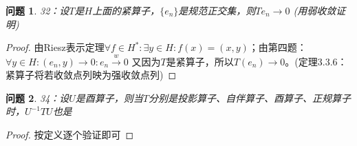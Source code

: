 \documentclass[a4paper, 12pt]{ctexart}
\newtheorem*{theorem}{问题}%
\begin{document}
\begin{theorem}
32：设$T$是$H$上面的紧算子，$\{e_n \}$是规范正交集，则$T{e_n} \to 0$ (用弱收敛证明)
\end{theorem}

\begin{proof}
由Riesz表示定理$\forall f \in H^*:\exists y\in H:f(x)=(x,y)$；由第四题：$\forall y\in H:(e_n,y)\to 0:e_n \overset{w}{\to} 0$
又因为$T$是紧算子，所以$T(e_n) \to 0$。(定理3.3.6：紧算子将若收敛点列映为强收敛点列)
\end{proof}

\begin{theorem}
34：设$U$是酉算子，则当$T$分别是投影算子、自伴算子、酉算子、正规算子时，$U^{-1}TU$也是
\end{theorem}
\begin{proof}
按定义逐个验证即可
\end{proof}
\end{document}
